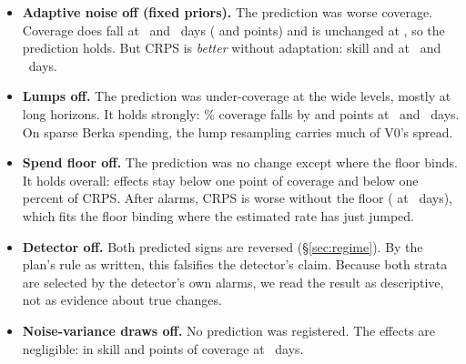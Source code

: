 \begin{itemize}
\item \textbf{Adaptive noise off (fixed priors).} The prediction was worse
  coverage. Coverage does fall at \hA\ and \hC\ days
  ( and
   points) and is unchanged
  at \hB, so the prediction holds. But CRPS is \emph{better} without
  adaptation: skill  and
   at \hB\ and \hC\ days.
\item \textbf{Lumps off.} The prediction was under-coverage at the wide
  levels, mostly at long horizons. It holds strongly: \lC\% coverage falls
  by  and
   points at \hB\ and \hC\ days.
  On sparse Berka spending, the lump resampling carries much of V0's
  spread.
\item \textbf{Spend floor off.} The prediction was no change except where
  the floor binds. It holds overall: effects stay below one point of
  coverage and below one percent of CRPS. After alarms, CRPS is worse
  without the floor
  ( at
  \hC\ days), which fits the floor binding where the estimated rate has
  just jumped.
\item \textbf{Detector off.} Both predicted signs are reversed
  (\S\ref{sec:regime}). By the plan's rule as written, this falsifies
  the detector's claim. Because both strata are selected by the detector's
  own alarms, we read the result as descriptive, not as evidence about
  true changes.
\item \textbf{Noise-variance draws off.} No prediction was registered.
  The effects are negligible:
   in skill and
   points of coverage at
  \hC\ days.
\end{itemize}

